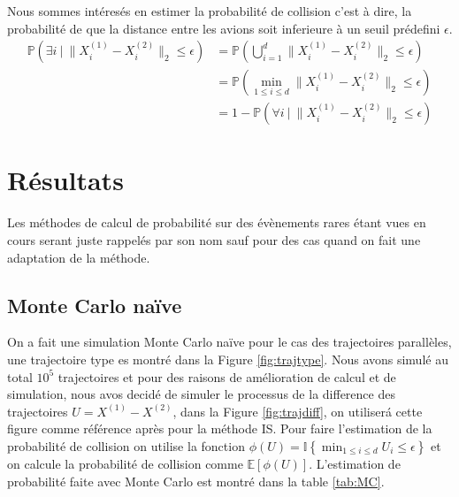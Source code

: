 \documentclass[a4paper, 12pt,twoside]{article}
\numberwithin{equation}{subsection}
\begin{document}
	Nous sommes intéresés en estimer la probabilité de collision c'est à dire, la probabilité de que la distance entre les avions soit inferieure à un seuil prédefini $\epsilon$.
	\begin{subequations}
	\begin{align}
		\mathbb{P}\left(\exists i~|~ \lVert X^{(1)}_{i} - X^{(2)}_{i} \rVert_2 \leq \epsilon \right)
		&= \mathbb{P}\left(\bigcup_{i=1}^{d} \lVert X^{(1)}_{i} - X^{(2)}_{i} \rVert_2 \leq \epsilon  \right)  \\
		&= \mathbb{P}\left(\min_{1\leq i\leq d} \lVert X^{(1)}_{i} - X^{(2)}_{i} \rVert_2 \leq \epsilon \right)  \\
		&= 1-\mathbb{P}\left(\forall i~|~ \lVert X^{(1)}_{i} - X^{(2)}_{i} \rVert_2 \leq \epsilon \right)
	\end{align}
	\end{subequations}
	
	
	
    \clearpage
    
    \section{Résultats}
	Les méthodes de calcul de probabilité sur des évènements rares étant vues en cours serant juste rappelés par son nom sauf pour des cas quand on fait une adaptation de la méthode.
	
	\subsection{Monte Carlo naïve} %
	\label{sub:monte_carlo_naive}
	On a fait une simulation Monte Carlo naïve pour le cas des trajectoires parallèles, une trajectoire type es montré dans la Figure \ref{fig:trajtype}. Nous avons simulé au total $10^5$ trajectoires et pour des raisons de amélioration de calcul et de simulation, nous avos decidé de simuler le processus de la difference des trajectoires $U=X^{(1)} - X^{(2)}$, dans la Figure \ref{fig:trajdiff}, on utiliserá cette figure comme référence après pour la méthode IS. Pour faire l'estimation de la probabilité de collision on utilise la fonction $\phi(U)=\mathbb{I}\left \{\min_{1\leq i \leq d} U_i \leq \epsilon \right \}$ et on calcule la probabilité de collision comme $\mathbb{E}[\phi(U)]$. L'estimation de probabilité faite avec Monte Carlo est montré dans la table \ref{tab:MC}.
	
\end{document}
